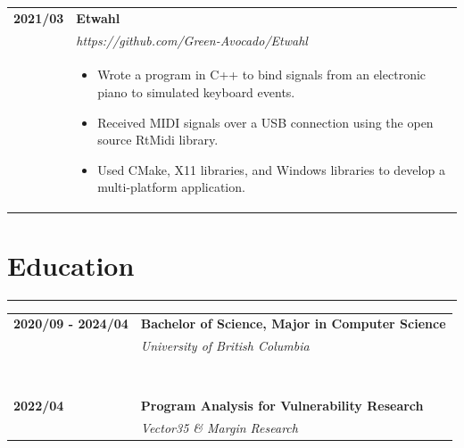 \documentclass[letterpaper]{article}
\newcommand{\sectcolor}{cyan}
\newcommand{\sect}[1]{\section*{#1}
                        {\color{\sectcolor}
                        \rule{\textwidth}{1pt}
                        \vspace{-4pt}}}
\begin{document}
        \begin{tabular}{p{} p{}}
            \textbf{2021/03} & \textbf{Etwahl} \\
            & \emph{https://github.com/Green-Avocado/Etwahl} \\
            & \begin{itemize}
                \item Wrote a program in C++ to bind signals from an electronic piano to simulated
                    keyboard events.
                \item Received MIDI signals over a USB connection using the open source RtMidi library.
                \item Used CMake, X11 libraries, and Windows libraries to develop a multi-platform
                    application.
            \end{itemize}
        \end{tabular}

    \sect{Education}

        \begin{tabular}{p{} p{}}
            \textbf{2020/09 - 2024/04} & \large\textbf{Bachelor of Science, Major in Computer Science} \\
            & \emph{University of British Columbia} \\
            \\\\\\\\\\\\\\\\
            \textbf{2022/04} & \large\textbf{Program Analysis for Vulnerability Research} \\
            & \emph{Vector35 \& Margin Research} \\
        \end{tabular}
\end{document}
